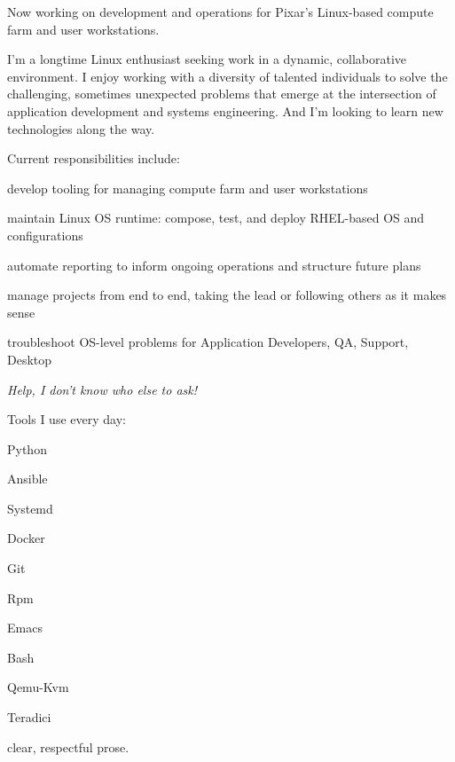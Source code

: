 
\begin{cvparagraph}

  Now working on development and operations for Pixar's Linux-based compute farm and user workstations.

  I'm a longtime Linux enthusiast seeking work in a dynamic, collaborative environment.
  I enjoy working with a diversity of talented individuals to solve the challenging, sometimes unexpected problems that emerge at the intersection of application development and systems engineering.
  And I'm looking to learn new technologies along the way.

  Current responsibilities include:
  \begin{cvitems1}
    \item develop tooling for managing compute farm and user workstations
    \item maintain Linux OS runtime:  compose, test, and deploy RHEL-based OS and configurations
    \item automate reporting to inform ongoing operations and structure future plans
    \item manage projects from end to end, taking the lead or following others as it makes sense
    \item troubleshoot OS-level problems for Application Developers, QA, Support, Desktop
    \item \emph{Help, I don't know who else to ask!}
  \end{cvitems1}

  \begin{cvbox}
  Tools I use every day:
  \begin{itemize*}[]
    \item[] Python  %
    \item Ansible
    \item Systemd
    \item Docker
    \item Git
    \item Rpm
    \item Emacs
    \item Bash
    \item Qemu-Kvm
    \item Teradici
    \item clear, respectful prose.
  \end{itemize*}
  \end{cvbox}

\end{cvparagraph}
